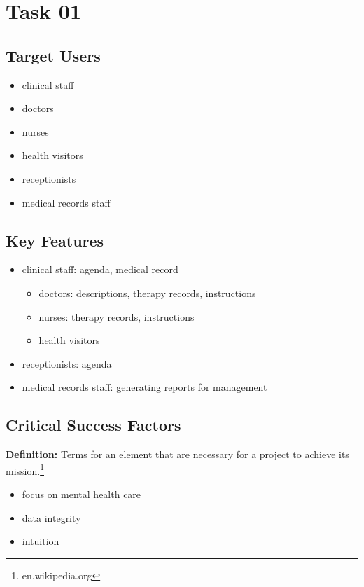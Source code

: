 \documentclass[11pt,a4paper]{scrreprt}
\begin{document}

\tableofcontents


\chapter{Task 01}
\section{Target Users}
\begin{itemize}
\item clinical staff
\item doctors
\item nurses
\item health visitors
\item receptionists
\item medical records staff
\end{itemize}

\section{Key Features}
\begin{itemize}
\item clinical staff: agenda, medical record
\begin{itemize}
\item doctors: descriptions, therapy records, instructions
\item nurses: therapy records, instructions
\item health visitors
\end{itemize}
\item receptionists: agenda
\item medical records staff: generating reports for management
\end{itemize}

\section{Critical Success Factors}
\textbf{Definition: }Terms for an element that are necessary for a project to achieve its mission.\footnote{en.wikipedia.org}
\begin{itemize}
\item focus on mental health care
\item data integrity
\item intuition
\end{itemize}
\end{document}
